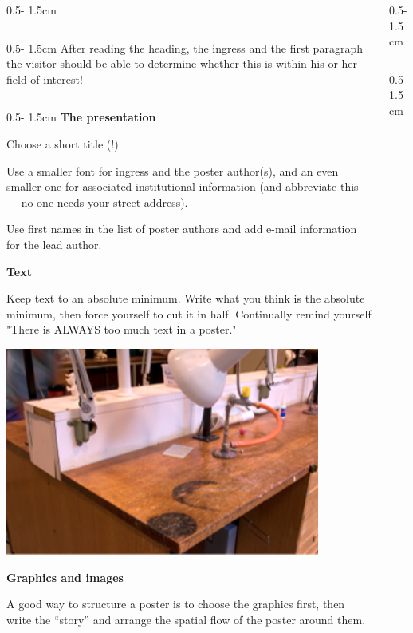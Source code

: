 \documentclass{uibposter}
\begin{document}
\begin{frame}
\begin{columns}
\begin{column}{0.5\textwidth - 1.5cm}
\begin{column}{0.5\textwidth - 1.5cm}
After reading the heading, the ingress and the first paragraph the visitor should be able to determine whether this is within his or her field of interest!
\end{column}
\begin{column}{0.5\textwidth - 1.5cm}
        \textbf{The presentation}
\vspace{0.5cm}

        Choose a short title (!)
\vspace{0.5cm}

        Use a smaller font for ingress and the poster author(s), and an even smaller one for associated institutional information (and abbreviate this — no one needs your street address). 
\vspace{0.2cm}

        Use first names in the list of poster authors and add e-mail information for the lead author. 
\vspace{0.5cm}

        \textbf{Text}
\vspace{0.5cm}

        Keep text to an absolute minimum. Write what you think is the absolute minimum, then force yourself to cut it in half.  Continually remind yourself "There is ALWAYS too much text in a poster."
        \vspace{0.5cm}

        \includegraphics[width = \textwidth]{uibposter-images/bilde2.png}
        \vspace{0.5cm}

        \textbf{Graphics and images}
\vspace{0.5cm}

        A good way to structure a poster is to choose the graphics first, then write the “story” and arrange the spatial flow of the poster around them. 
    \end{column}
\end{column}
\begin{column}{0.5\textwidth - 1.5cm}
\begin{column}{0.5\textwidth - 1.5cm}
\vspace*{-25.5cm}


\end{column}
\end{column}
\end{columns}
\end{frame}
\end{document}
